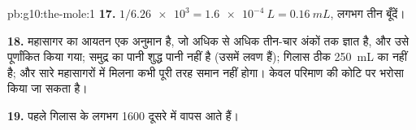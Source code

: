 \begin{solution}{pb:g10:the-mole:1}
\textbf{17.} $1 / \num{6.26e3} = \qty{1.6e-4}{L} = \qty{0.16}{mL}$, लगभग
तीन बूँदें।

\textbf{18.} महासागर का आयतन एक अनुमान है, जो अधिक से अधिक तीन-चार अंकों तक ज्ञात
है, और उसे पूर्णांकित किया गया; समुद्र का पानी शुद्ध पानी नहीं है (उसमें
लवण हैं); गिलास ठीक \qty{250}{mL} का नहीं है; और सारे महासागरों में मिलना
कभी पूरी तरह समान नहीं होगा। केवल परिमाण की कोटि पर भरोसा किया
जा सकता है।

\textbf{19.} पहले गिलास के लगभग 1600  दूसरे में वापस
आते हैं।
\end{solution}
